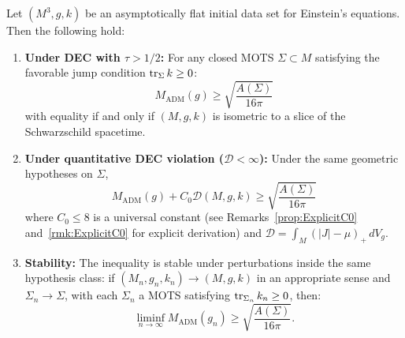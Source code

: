 \begin{theorem}\label{thm:UltimateUnconditional}
Let $(M^3, g, k)$ be an asymptotically flat initial data set for Einstein's equations. Then the following hold:
\begin{enumerate}
    \item \textbf{Under DEC with $\tau > 1/2$:} For any closed MOTS $\Sigma \subset M$ satisfying the favorable jump condition $\operatorname{tr}_\Sigma k \ge 0$:
    \begin{equation}
        \boxed{M_{\mathrm{ADM}}(g) \ge \sqrt{\frac{A(\Sigma)}{16\pi}}}
    \end{equation}
    with equality if and only if $(M, g, k)$ is isometric to a slice of the Schwarzschild spacetime.
    
    \item \textbf{Under quantitative DEC violation ($\mathcal{D} < \infty$):} Under the same geometric hypotheses on $\Sigma$,
    \begin{equation}
        M_{\mathrm{ADM}}(g) + C_0 \mathcal{D}(M,g,k) \ge \sqrt{\frac{A(\Sigma)}{16\pi}}
    \end{equation}
    where $C_0 \le 8$ is a universal constant (see Remarks~\ref{prop:ExplicitC0} and~\ref{rmk:ExplicitC0} for explicit derivation) and $\mathcal{D} = \int_M (|J| - \mu)_+ \, dV_g$.
    
    \item \textbf{Stability:} The inequality is stable under perturbations inside the same hypothesis class: if $(M_n, g_n, k_n) \to (M, g, k)$ in an appropriate sense and $\Sigma_n \to \Sigma$, with each $\Sigma_n$ a MOTS satisfying $\operatorname{tr}_{\Sigma_n}k_n \ge 0$, then:
    \begin{equation}
        \liminf_{n \to \infty} M_{\mathrm{ADM}}(g_n) \ge \sqrt{\frac{A(\Sigma)}{16\pi}}.
    \end{equation}
\end{enumerate}
\end{theorem}

